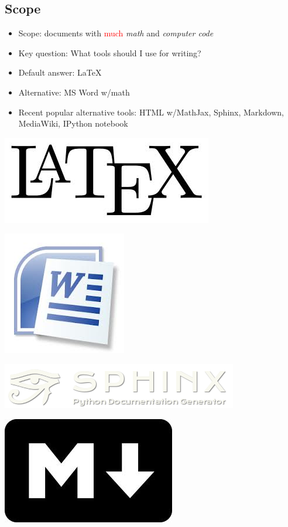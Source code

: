 \documentclass[%
oneside,                 %
final,                   %
10pt]{article}
\begin{document}
\subsection{Scope}
\begin{itemize}
  \item Scope: documents with \textcolor{red}{much} \emph{math} and \emph{computer code}
  \item Key question: What tools should I use for writing?
  \item Default answer: {\LaTeX}
  \item Alternative: MS Word w/math
  \item Recent popular alternative tools: HTML w/MathJax, Sphinx, Markdown, MediaWiki, IPython notebook
\end{itemize}
\noindent
\vspace{6mm}
\centerline{\includegraphics[width=0.3\linewidth]{testfigs/LaTeX_logo.jpg}}
\vspace{6mm}
\vspace{6mm}
\centerline{\includegraphics[width=0.2\linewidth]{testfigs/MS_Word_logo.jpg}}
\vspace{6mm}
\vspace{6mm}
\centerline{\includegraphics[width=0.4\linewidth]{testfigs/sphinx_logo.png}}
\vspace{6mm}
\vspace{6mm}
\centerline{\includegraphics[width=0.2\linewidth]{testfigs/markdown_logo.jpg}}
\end{document}
